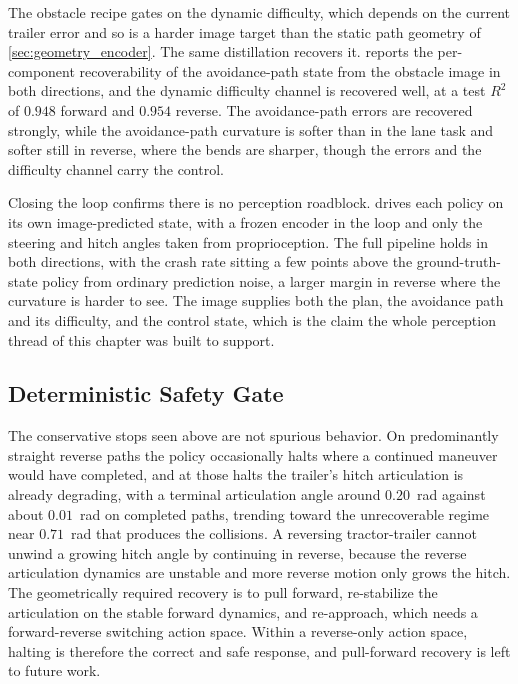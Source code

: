 The obstacle recipe gates on the dynamic difficulty, which depends on the current trailer error and so is a harder image target than the static path geometry of \cref{sec:geometry_encoder}. The same distillation recovers it.  reports the per-component recoverability of the avoidance-path state from the obstacle image in both directions, and the dynamic difficulty channel is recovered well, at a test $R^2$ of $0.948$ forward and $0.954$ reverse. The avoidance-path errors are recovered strongly, while the avoidance-path curvature is softer than in the lane task and softer still in reverse, where the bends are sharper, though the errors and the difficulty channel carry the control.



Closing the loop confirms there is no perception roadblock.  drives each policy on its own image-predicted state, with a frozen encoder in the loop and only the steering and hitch angles taken from proprioception. The full pipeline holds in both directions, with the crash rate sitting a few points above the ground-truth-state policy from ordinary prediction noise, a larger margin in reverse where the curvature is harder to see. The image supplies both the plan, the avoidance path and its difficulty, and the control state, which is the claim the whole perception thread of this chapter was built to support.



\subsection{Deterministic Safety Gate}

The conservative stops seen above are not spurious behavior. On predominantly straight reverse paths the policy occasionally halts where a continued maneuver would have completed, and at those halts the trailer's hitch articulation is already degrading, with a terminal articulation angle around $0.20$~rad against about $0.01$~rad on completed paths, trending toward the unrecoverable regime near $0.71$~rad that produces the collisions. A reversing tractor-trailer cannot unwind a growing hitch angle by continuing in reverse, because the reverse articulation dynamics are unstable and more reverse motion only grows the hitch. The geometrically required recovery is to pull forward, re-stabilize the articulation on the stable forward dynamics, and re-approach, which needs a forward-reverse switching action space. Within a reverse-only action space, halting is therefore the correct and safe response, and pull-forward recovery is left to future work.

